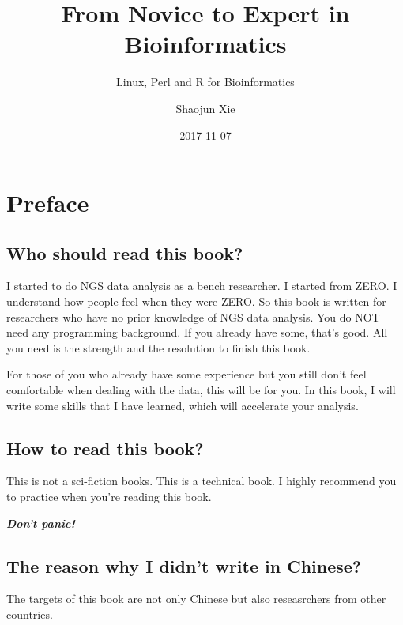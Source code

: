 \documentclass[]{book}
\title{From Novice to Expert in Bioinformatics}
\subtitle{Linux, Perl and R for Bioinformatics}
\author{Shaojun Xie}
\date{2017-11-07}
\theoremstyle{definition}
\theoremstyle{definition}
\theoremstyle{definition}
\theoremstyle{remark}
\begin{document}
\maketitle

{
\setcounter{tocdepth}{1}
\tableofcontents
}
\chapter*{Preface}\label{preface}

\section*{Who should read this book?}\label{who-should-read-this-book}

I started to do NGS data analysis as a bench researcher. I started from
ZERO. I understand how people feel when they were ZERO. So this book is
written for researchers who have no prior knowledge of NGS data
analysis. You do NOT need any programming background. If you already
have some, that's good. All you need is the strength and the resolution
to finish this book.

For those of you who already have some experience but you still don't
feel comfortable when dealing with the data, this will be for you. In
this book, I will write some skills that I have learned, which will
accelerate your analysis.

\section*{How to read this book?}\label{how-to-read-this-book}

This is not a sci-fiction books. This is a technical book. I highly
recommend you to practice when you're reading this book.

\emph{\textbf{Don't panic!}}

\section*{The reason why I didn't write in
Chinese?}\label{the-reason-why-i-didnt-write-in-chinese}

The targets of this book are not only Chinese but also reseasrchers from
other countries.
\end{document}

